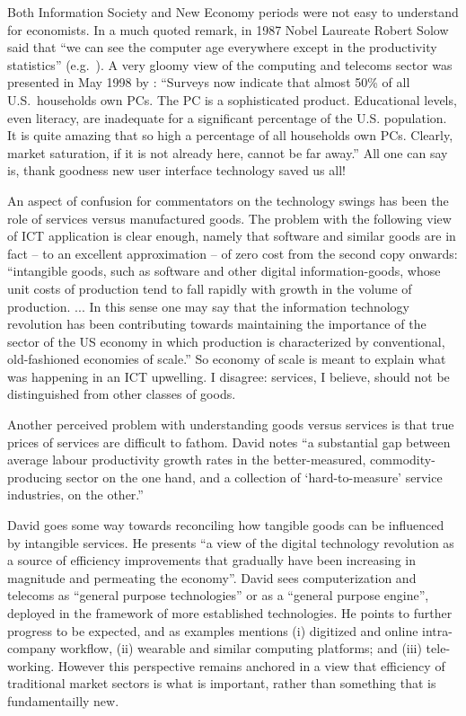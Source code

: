 \documentclass{article}
\begin{document}
Both Information Society and New Economy periods were not easy to 
understand for economists.  In a much quoted remark, in 1987
 Nobel Laureate Robert 
Solow said that ``we can see the computer age everywhere except in 
the productivity statistics'' (e.g.\ \cite{minehan}).  A very gloomy view of the computing and telecoms sector was presented
in May 1998 by \cite{veneroso}: 
``Surveys now indicate that almost 50\% of all U.S.\  households own PCs. 
The PC is a sophisticated product. Educational levels, even literacy, are 
inadequate for a significant percentage of the U.S.  population. It is 
quite amazing that so high a percentage of all households own PCs. 
Clearly, market saturation, if it is not already here, cannot be far away.''
All one can say is, thank goodness new user interface technology saved
us all!  

An aspect of confusion for commentators on the technology swings has 
been the role of services versus manufactured goods.  
The problem with the following view of ICT application \cite{eib} is clear 
enough, namely that software and similar goods are in fact -- to an excellent 
approximation -- of zero cost from the second copy onwards: 
``intangible
goods, such as software and other digital information-goods, whose 
unit costs of production tend
to fall rapidly with growth in the volume of production.  ...
In this sense one may say that the information technology
revolution has been contributing towards maintaining the importance of 
the sector of the US
economy in which production is characterized by conventional, 
old-fashioned economies of scale.''  
So economy of scale is meant to explain what was happening in an ICT
upwelling.  I disagree: services, I believe, should not be distinguished
from other classes of goods.

Another perceived problem with understanding goods versus services 
is that true prices 
of services are difficult to fathom.   David \cite{eib} notes
``a substantial gap between average labour productivity
growth rates in the better-measured, commodity-producing 
sector on the one hand, and a collection
of `hard-to-measure' service industries, on the other.''

David \cite{eib} goes some way towards reconciling how tangible
goods can be influenced by intangible services.  He presents
``a view of the digital technology revolution as a source of 
efficiency improvements that gradually
have been increasing in magnitude and permeating the economy''.  David sees computerization and telecoms as ``general purpose technologies''
or as a ``general purpose engine'', deployed in the framework of 
more established technologies.  He points to further progress to be 
expected, and as examples mentions (i) digitized and online intra-company
workflow, (ii) wearable and similar computing platforms; and (iii) 
tele-working.  However this perspective remains anchored in a view that 
efficiency of traditional market sectors is what is 
important, rather than something that is fundamentailly new. 
\end{document}
